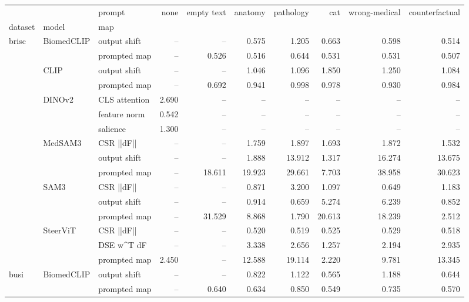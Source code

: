\begin{tabular}{lllrrrrrrr}
\toprule
 &  & prompt & none & empty text & anatomy & pathology & cat & wrong-medical & counterfactual \\
dataset & model & map &  &  &  &  &  &  &  \\
\midrule
\multirow[t]{16}{*}{brisc} & \multirow[t]{2}{*}{BiomedCLIP} & output shift & -- & -- & 0.575 & 1.205 & 0.663 & 0.598 & 0.514 \\
 &  & prompted map & -- & 0.526 & 0.516 & 0.644 & 0.531 & 0.531 & 0.507 \\
\cline{2-10}
 & \multirow[t]{2}{*}{CLIP} & output shift & -- & -- & 1.046 & 1.096 & 1.850 & 1.250 & 1.084 \\
 &  & prompted map & -- & 0.692 & 0.941 & 0.998 & 0.978 & 0.930 & 0.984 \\
\cline{2-10}
 & \multirow[t]{3}{*}{DINOv2} & CLS attention & 2.690 & -- & -- & -- & -- & -- & -- \\
 &  & feature norm & 0.542 & -- & -- & -- & -- & -- & -- \\
 &  & salience & 1.300 & -- & -- & -- & -- & -- & -- \\
\cline{2-10}
 & \multirow[t]{3}{*}{MedSAM3} & CSR  ||dF|| & -- & -- & 1.759 & 1.897 & 1.693 & 1.872 & 1.532 \\
 &  & output shift & -- & -- & 1.888 & 13.912 & 1.317 & 16.274 & 13.675 \\
 &  & prompted map & -- & 18.611 & 19.923 & 29.661 & 7.703 & 38.958 & 30.623 \\
\cline{2-10}
 & \multirow[t]{3}{*}{SAM3} & CSR  ||dF|| & -- & -- & 0.871 & 3.200 & 1.097 & 0.649 & 1.183 \\
 &  & output shift & -- & -- & 0.914 & 0.659 & 5.274 & 6.239 & 0.852 \\
 &  & prompted map & -- & 31.529 & 8.868 & 1.790 & 20.613 & 18.239 & 2.512 \\
\cline{2-10}
 & \multirow[t]{3}{*}{SteerViT} & CSR  ||dF|| & -- & -- & 0.520 & 0.519 & 0.525 & 0.529 & 0.518 \\
 &  & DSE  w^T dF & -- & -- & 3.338 & 2.656 & 1.257 & 2.194 & 2.935 \\
 &  & prompted map & 2.450 & -- & 12.588 & 19.114 & 2.220 & 9.781 & 13.345 \\
\cline{1-10} \cline{2-10}
\multirow[t]{16}{*}{busi} & \multirow[t]{2}{*}{BiomedCLIP} & output shift & -- & -- & 0.822 & 1.122 & 0.565 & 1.188 & 0.644 \\
 &  & prompted map & -- & 0.640 & 0.634 & 0.850 & 0.549 & 0.735 & 0.570 \\

\end{tabular}
